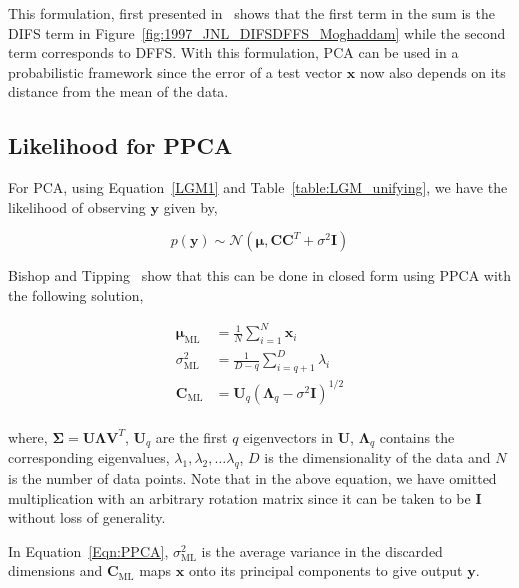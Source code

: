 This formulation, first presented in~\cite{1997_JNL_EigenTRK_Moghaddam} shows that the first term in the sum is the DIFS term in Figure~\ref{fig:1997_JNL_DIFSDFFS_Moghaddam} while the second term corresponds to DFFS.  With this formulation, PCA can be used in a probabilistic framework since the error of a test vector $\mathbf{x}$ now also depends on its distance from the mean of the data.

\subsection{Likelihood for PPCA}
For PCA, using Equation~\ref{LGM1} and Table~\ref{table:LGM_unifying}, we have the likelihood of observing $\mathbf{y}$ given by,

\begin{equation}
p(\mathbf{y}) \sim \mathcal{N}(\boldsymbol\mu, \mathbf{C}\mathbf{C}^T + \sigma^2 \mathbf{I})
\end{equation}

Bishop and Tipping~\cite{1999_JNL_PPCA_Tipping} show that this can be done in closed form using PPCA with the following solution,

\begin{equation}
\begin{array}{lllll}
\mathbf{\boldsymbol\mu}_{\textrm{ML}} &=\frac{1}{N}\sum\limits_{i=1}^N \mathbf{x}_i\\
\sigma^2_{\textrm{ML}} &= \frac{1}{D-q}\sum\limits_{i=q+1}^D \lambda_i\\
\mathbf{C}_{\textrm{ML}} &= \mathbf{U}_q(\mathbf{\Lambda}_q - \sigma^2\mathbf{I})^{1/2} \\
\end{array}
\label{Eqn:PPCA}
\end{equation}

where, $\boldsymbol\Sigma = \mathbf{U}\mathbf{\Lambda}\mathbf{V}^T$, $\mathbf{U}_q$ are the first $q$ eigenvectors in $\mathbf{U}$, $\mathbf{\Lambda}_q$ contains the corresponding eigenvalues, $\lambda_1, \lambda_2, \ldots \lambda_q$, $D$ is the dimensionality of the data and $N$ is the number of data points.  Note that in the above equation, we have omitted multiplication with an arbitrary rotation matrix since it can be taken to be $\mathbf{I}$ without loss of generality.  

In Equation~\ref{Eqn:PPCA}, $\sigma^2_{\textrm{ML}}$ is the average variance in the discarded dimensions and $\mathbf{C}_{\textrm{ML}}$ maps $\mathbf{x}$ onto its principal components to give output $\mathbf{y}$.


